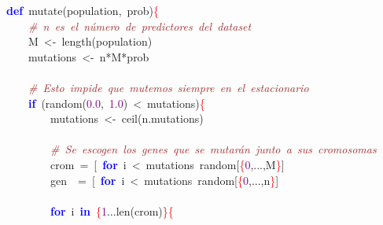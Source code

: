 \noindent
\mbox{}\textbf{\textcolor{Blue}{def}}\ mutate\textcolor{BrickRed}{(}population\textcolor{BrickRed}{,}\ prob\textcolor{BrickRed}{)}\textcolor{Red}{\{} \\
\mbox{}\ \ \ \ \textit{\textcolor{Brown}{\#\ n\ es\ el\ número\ de\ predictores\ del\ dataset}} \\
\mbox{}\ \ \ \ M\ \textcolor{BrickRed}{\textless{}-}\ length\textcolor{BrickRed}{(}population\textcolor{BrickRed}{)} \\
\mbox{}\ \ \ \ mutations\ \textcolor{BrickRed}{\textless{}-}\ n\textcolor{BrickRed}{*}M\textcolor{BrickRed}{*}prob \\
\mbox{} \\
\mbox{}\ \ \ \ \textit{\textcolor{Brown}{\#\ Esto\ impide\ que\ mutemos\ siempre\ en\ el\ estacionario}} \\
\mbox{}\ \ \ \ \textbf{\textcolor{Blue}{if}}\ \textcolor{BrickRed}{(}random\textcolor{BrickRed}{(}\textcolor{Purple}{0.0}\textcolor{BrickRed}{,}\ \textcolor{Purple}{1.0}\textcolor{BrickRed}{)}\ \textcolor{BrickRed}{\textless{}}\ mutations\textcolor{BrickRed}{)}\textcolor{Red}{\{} \\
\mbox{}\ \ \ \ \ \ \ \ mutations\ \textcolor{BrickRed}{\textless{}-}\ ceil\textcolor{BrickRed}{(}n\textcolor{BrickRed}{.}mutations\textcolor{BrickRed}{)} \\
\mbox{} \\
\mbox{}\ \ \ \ \ \ \ \ \textit{\textcolor{Brown}{\#\ Se\ escogen\ los\ genes\ que\ se\ mutarán\ junto\ a\ sus\ cromosomas}} \\
\mbox{}\ \ \ \ \ \ \ \ crom\ \textcolor{BrickRed}{=}\ \textcolor{BrickRed}{[}\ \textbf{\textcolor{Blue}{for}}\ i\ \textcolor{BrickRed}{\textless{}}\ mutations\ random\textcolor{BrickRed}{[}\textcolor{Red}{\{}\textcolor{Purple}{0}\textcolor{BrickRed}{,...,}M\textcolor{Red}{\}}\textcolor{BrickRed}{]} \\
\mbox{}\ \ \ \ \ \ \ \ gen\ \ \textcolor{BrickRed}{=}\ \textcolor{BrickRed}{[}\ \textbf{\textcolor{Blue}{for}}\ i\ \textcolor{BrickRed}{\textless{}}\ mutations\ random\textcolor{BrickRed}{[}\textcolor{Red}{\{}\textcolor{Purple}{0}\textcolor{BrickRed}{,...,}n\textcolor{Red}{\}}\textcolor{BrickRed}{]} \\
\mbox{} \\
\mbox{}\ \ \ \ \ \ \ \ \textbf{\textcolor{Blue}{for}}\ i\ \textbf{\textcolor{Blue}{in}}\ \textcolor{Red}{\{}\textcolor{Purple}{1}\textcolor{BrickRed}{...}len\textcolor{BrickRed}{(}crom\textcolor{BrickRed}{)}\textcolor{Red}{\}\{} \\
